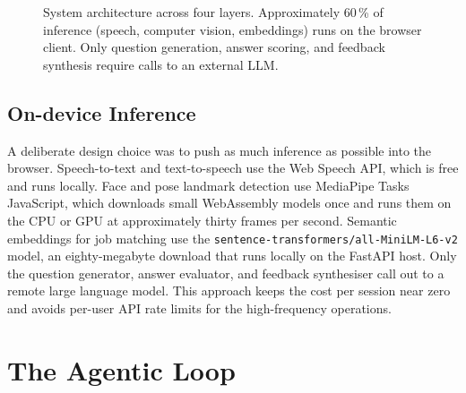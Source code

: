 \documentclass[11pt,a4paper]{article}
\begin{document}
\begin{figure}[h]
\caption{System architecture across four layers. Approximately 60\,\% of
inference (speech, computer vision, embeddings) runs on the browser client.
Only question generation, answer scoring, and feedback synthesis require
calls to an external LLM.}
\label{fig:arch}
\end{figure}

\subsection{On-device Inference}

A deliberate design choice was to push as much inference as possible into
the browser. Speech-to-text and text-to-speech use the Web Speech API,
which is free and runs locally. Face and pose landmark detection use
MediaPipe Tasks JavaScript, which downloads small WebAssembly models once
and runs them on the CPU or GPU at approximately thirty frames per second.
Semantic embeddings for job matching use the
\texttt{sentence-transformers/all-MiniLM-L6-v2} model, an eighty-megabyte
download that runs locally on the FastAPI host. Only the
question generator, answer evaluator, and feedback synthesiser call out to
a remote large language model. This approach keeps the cost per session
near zero and avoids per-user API rate limits for the high-frequency
operations.

\section{The Agentic Loop}
\end{document}
